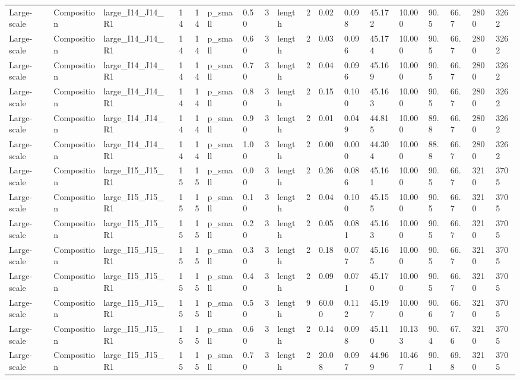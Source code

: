 \begin{longtable}{lllrrllllrllllllll}
Large-scale & Composition & large\_I14\_J14\_R1 & 14 & 14 & p\_small & 0.50 & 3 & length & 2 & 0.02 & 0.098 & 45.172 & 10.000 & 90.5 & 66.7 & 2800 & 3262 \\
Large-scale & Composition & large\_I14\_J14\_R1 & 14 & 14 & p\_small & 0.60 & 3 & length & 2 & 0.03 & 0.096 & 45.174 & 10.000 & 90.5 & 66.7 & 2800 & 3262 \\
Large-scale & Composition & large\_I14\_J14\_R1 & 14 & 14 & p\_small & 0.70 & 3 & length & 2 & 0.04 & 0.096 & 45.169 & 10.000 & 90.5 & 66.7 & 2800 & 3262 \\
Large-scale & Composition & large\_I14\_J14\_R1 & 14 & 14 & p\_small & 0.80 & 3 & length & 2 & 0.15 & 0.100 & 45.163 & 10.000 & 90.5 & 66.7 & 2800 & 3262 \\
Large-scale & Composition & large\_I14\_J14\_R1 & 14 & 14 & p\_small & 0.90 & 3 & length & 2 & 0.01 & 0.049 & 44.815 & 10.000 & 89.8 & 66.7 & 2800 & 3262 \\
Large-scale & Composition & large\_I14\_J14\_R1 & 14 & 14 & p\_small & 1.00 & 3 & length & 2 & 0.00 & 0.000 & 44.304 & 10.000 & 88.8 & 66.7 & 2800 & 3262 \\
Large-scale & Composition & large\_I15\_J15\_R1 & 15 & 15 & p\_small & 0.00 & 3 & length & 2 & 0.26 & 0.086 & 45.161 & 10.000 & 90.5 & 66.7 & 3210 & 3705 \\
Large-scale & Composition & large\_I15\_J15\_R1 & 15 & 15 & p\_small & 0.10 & 3 & length & 2 & 0.04 & 0.100 & 45.155 & 10.000 & 90.5 & 66.7 & 3210 & 3705 \\
Large-scale & Composition & large\_I15\_J15\_R1 & 15 & 15 & p\_small & 0.20 & 3 & length & 2 & 0.05 & 0.081 & 45.163 & 10.000 & 90.5 & 66.7 & 3210 & 3705 \\
Large-scale & Composition & large\_I15\_J15\_R1 & 15 & 15 & p\_small & 0.30 & 3 & length & 2 & 0.18 & 0.077 & 45.165 & 10.000 & 90.5 & 66.7 & 3210 & 3705 \\
Large-scale & Composition & large\_I15\_J15\_R1 & 15 & 15 & p\_small & 0.40 & 3 & length & 2 & 0.09 & 0.071 & 45.170 & 10.000 & 90.5 & 66.7 & 3210 & 3705 \\
Large-scale & Composition & large\_I15\_J15\_R1 & 15 & 15 & p\_small & 0.50 & 3 & length & 9 & 60.00 & 0.112 & 45.197 & 10.000 & 90.6 & 66.7 & 3210 & 3705 \\
Large-scale & Composition & large\_I15\_J15\_R1 & 15 & 15 & p\_small & 0.60 & 3 & length & 2 & 0.14 & 0.098 & 45.110 & 10.133 & 90.4 & 67.6 & 3210 & 3705 \\
Large-scale & Composition & large\_I15\_J15\_R1 & 15 & 15 & p\_small & 0.70 & 3 & length & 2 & 20.08 & 0.097 & 44.969 & 10.467 & 90.1 & 69.8 & 3210 & 3705 \\

\end{longtable}
